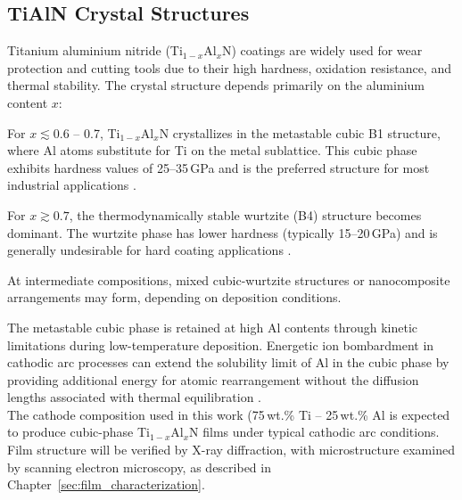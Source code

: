 \subsection{TiAlN Crystal Structures}

Titanium aluminium nitride (Ti$_{1-x}$Al$_x$N) coatings are widely used for wear protection and cutting tools due to their high hardness, oxidation resistance, and thermal stability. The crystal structure depends primarily on the aluminium content $x$:\\


\begin{compactitem}
	\item For $x \lesssim 0.6$ – 0.7, Ti$_{1-x}$Al$_x$N crystallizes in the metastable cubic B1 structure, where Al atoms substitute for Ti on the metal sublattice. This cubic phase exhibits hardness values of 25–35\,GPa and is the preferred structure for most industrial applications \cite{paldey2003}.
	
	\item For $x \gtrsim 0.7$, the thermodynamically stable wurtzite (B4) structure becomes dominant. The wurtzite phase has lower hardness (typically 15–20\,GPa) and is generally undesirable for hard coating applications \cite{mayrhofer2006}.
	
	\item At intermediate compositions, mixed cubic-wurtzite structures or nanocomposite arrangements may form, depending on deposition conditions.
\end{compactitem}
\vspace{12pt}


The metastable cubic phase is retained at high Al contents through kinetic limitations during low-temperature deposition. Energetic ion bombardment in cathodic arc processes can extend the solubility limit of Al in the cubic phase by providing additional energy for atomic rearrangement without the diffusion lengths associated with thermal equilibration \cite{rachbauer2011}.\\

The cathode composition used in this work (75\,wt.\% Ti – 25\,wt.\% Al is expected to produce cubic-phase Ti$_{1-x}$Al$_x$N films under typical cathodic arc conditions. Film structure will be verified by X-ray diffraction, with microstructure examined by scanning electron microscopy, as described in Chapter~\ref{sec:film_characterization}.\\




